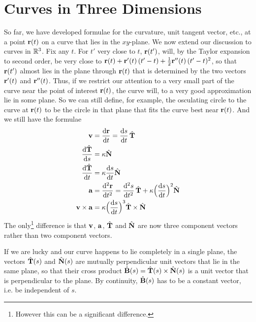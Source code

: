 \section{Curves in Three Dimensions}\label{sec:Curve3d}
So far, we have developed formulae for the curvature, unit tangent vector,
etc., at a point $\mathbf{r}(t)$ on a curve that lies in the $xy$-plane. We 
now extend our discussion to curves in $\mathbb{R}^3$. Fix any $t$.
For $t'$ very close to $t$, $\mathbf{r}(t')$, will, by the Taylor expansion 
to second order, be very close to $\mathbf{r}(t) + \mathbf{r}'(t)\,(t'-t) 
+\frac{1}{2}\mathbf{r}''(t)\,(t'-t)^2$, so that $\mathbf{r}(t')$ almost lies in the 
plane through $\mathbf{r}(t)$ that is determined by the two vectors $\mathbf{r}'(t)$ and 
$\mathbf{r}''(t)$. Thus, if we restrict
our attention to a very small part of the curve near the point of 
interest $\mathbf{r}(t)$, the curve will, to a very good approximation lie in 
some plane. So we can still define, for example, the osculating circle 
to the curve at $\mathbf{r}(t)$ to be the circle in that plane that fits the 
curve best near $\mathbf{r}(t)$. And we still have the formulae
\begin{align*}
\vv&=\diff{\vr}{t}=\diff{s}{t}\,\hat\vT\\
\diff{\hat\vT}{s} &= \ka\hat\vN\\
\diff{\hat\vT}{t} &= \ka\diff{s}{t}\hat\vN\\
\va&=\difftwo{\vr}{t}=\difftwo{s}{t}\,\hat\vT
                             +\ka\Big(\diff{s}{t}\Big)^2\hat\vN\\
\vv\times\va &= \ka \Big(\diff{s}{t}\Big)^3\hat\vT\times\hat\vN
\end{align*}
The only\footnote{However this can be a significant difference.} 
difference is that $\mathbf{v}$, $\mathbf{a}$, $\hat{\mathbf{T}}$ and $\hat{\mathbf{N}}$
are now three component vectors rather than two component vectors. 

If we are lucky and our curve happens to lie completely in a single plane, 
the vectors $\hat{\mathbf{T}}(s)$ and $\hat{\mathbf{N}}(s)$ are mutually perpendicular 
unit vectors that lie in the same plane, so that their cross product
$\hat{\mathbf{B}}(s) = \hat{\mathbf{T}}(s)\times\hat{\mathbf{N}}(s)$
is a unit vector that is perpendicular to the plane.  By continuity, 
$\hat{\mathbf{B}}(s)$ has to be a constant vector, i.e. be independent of $s$. 

